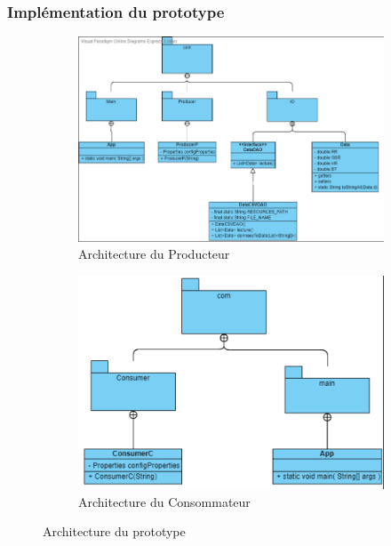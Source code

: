 \documentclass{article}
\begin{document}
		\subsubsection{Implémentation du prototype}
			\begin{figure}[p]
				\centering
				\begin{subfigure}{0.5\textwidth}
					\hspace*{-1cm}
					\includegraphics[scale=0.65]{../include/archiProducer.PNG}
					\caption{Architecture du Producteur}
					\label{fig:archiproducer}
				\end{subfigure}\newline
				\begin{subfigure}{0.5\textwidth}
					\includegraphics[scale=0.8]{../include/archiConsumer.PNG}
					\caption{Architecture du Consommateur}
					\label{fig:archiconsumer}
				\end{subfigure}
				\caption{Architecture du prototype}
				\label{fig:archiimp}
			\end{figure}
\end{document}
